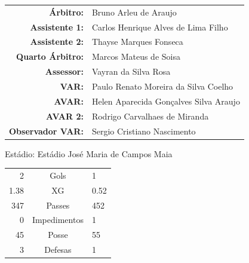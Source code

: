 \documentclass[11pt]{article}
\begin{document}
\vspace{0.5cm}
\begin{minipage}{0.65\textwidth}
\begin{center}
\begin{tabular}{rl}
\textbf{Árbitro:} & Bruno Arleu de Araujo \\
\textbf{Assistente 1:} & Carlos Henrique Alves de Lima Filho \\
\textbf{Assistente 2:} & Thayse Marques Fonseca \\
\textbf{Quarto Árbitro:} & Marcos Mateus de Soisa \\
\textbf{Assessor:} & Vayran da Silva Rosa \\
\textbf{VAR:} & Paulo Renato Moreira da Silva Coelho \\
\textbf{AVAR:} & Helen Aparecida Gonçalves Silva Araujo \\
\textbf{AVAR 2:} & Rodrigo Carvalhaes de Miranda \\
\textbf{Observador VAR:} & Sergio Cristiano Nascimento \\
\end{tabular}
\end{center}
\end{minipage}
\begin{minipage}{0.3\textwidth}
Estádio: Estádio José Maria de Campos Maia\\
\begin{tabular}{rcl}
2 & Gols & 1 \\
1.38 & XG & 0.52 \\
347 & Passes & 452 \\
0 & Impedimentos & 1 \\
45 & Posse & 55 \\
3 & Defesas & 1 \\
\end{tabular}
\end{minipage}
\newpage
\end{document}
